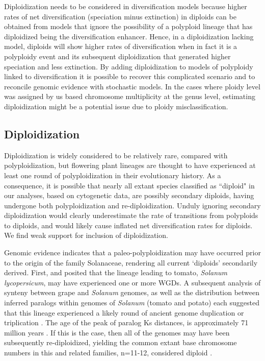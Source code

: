 
Diploidization needs to be considered in diversification models because higher rates of net diversification (speciation minus extinction) in diploids can be obtained from models that ignore the possibility of a polyploid lineage that has diploidized being the diversification enhancer. 
Hence, in a diploidization lacking model, diploids will show higher rates of diversification when in fact it is a polyploidy event and its subsequent diploidization that generated higher speciation and less extinction.  
By adding diploidization to models of polyploidy linked to diversification it is possible to recover this complicated scenario and to reconcile genomic evidence with stochastic models. 
In the cases where ploidy level was assigned by us based chromosome multiplicity at the genus level, estimating diploidization  might be a potential issue due to ploidy misclassification.  


\subsection*{Diploidization}

Diploidization is widely considered to be relatively rare, compared with polyploidization, but flowering plant lineages are thought to have experienced at least one round of polyploidization in their evolutionary history. %
As a consequence, it is possible that nearly all extant species classified as ``diploid" in our analyses, based on cytogenetic data, are possibly secondary diploids, having undergone both polyploidization and re-diploidization.
Unduly ignoring secondary diploidization would clearly underestimate the rate of transitions from polyploids to diploids, and would likely cause inflated net diversification rates for diploids.
We find weak support for inclusion of diploidization. %

Genomic evidence indicates that a paleo-polyploidization may have occurred prior to the origin of the family Solanaceae, rendering all current `diploids' secondarily derived. 
First, \citet{ku2000} and \citet{blanc2004} posited that the lineage leading to tomato, \textit{Solanum lycopersicum}, may have experienced one or more WGDs.
A subsequent analysis of synteny between grape and \textit{Solanum} genomes, as well as the distribution between inferred paralogs within genomes of \textit{Solanum} (tomato and potato) each suggested that this lineage experienced a likely round of ancient genome duplication or triplication \citep{tomato2012}. 
The age of the peak of paralog Ks distances, is approximately 71 million years \citep{tomato2012}. 
If this is the case, then all of the genomes may have been subsequently re-diploidized, yielding the common extant base chromosome numbers in this and related families, n=11-12, considered diploid \citep{robertson_2011}. 

